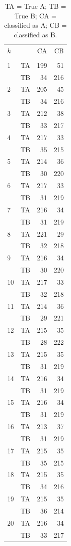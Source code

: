 \documentclass[a4paper,11pt]{article}
\begin{document}
\begin{table}
  \caption{TA = True A; TB = True B; CA = classified as A; CB = classified as B.}
\begin{tabular}{lcrr}
$k$ && CA & CB \\ \\
 1 & TA & 199 &    51 \\
& TB &  34 &   216 \\
 2 & TA & 205 &    45 \\
& TB &  34 &   216 \\
 3 & TA & 212 &    38 \\
& TB &  33 &   217 \\
 4 & TA & 217 &    33 \\
& TB &  35 &   215 \\
 5 & TA & 214 &    36 \\
& TB &  30 &   220 \\
 6 & TA & 217 &    33 \\
& TB &  31 &   219 \\
 7 & TA & 216 &    34 \\
& TB &  31 &   219 \\
 8 & TA & 221 &    29 \\
& TB &  32 &   218 \\
 9 & TA & 216 &    34 \\
& TB &  30 &   220 \\
 10 & TA & 217 &    33 \\
& TB &  32 &   218 \\
 11 & TA & 214 &    36 \\
& TB &  29 &   221 \\
 12 & TA & 215 &    35 \\
& TB &  28 &   222 \\
 13 & TA & 215 &    35 \\
& TB &  31 &   219 \\
 14 & TA & 216 &    34 \\
& TB &  31 &   219 \\
 15 & TA & 216 &    34 \\
& TB &  31 &   219 \\
 16 & TA & 213 &    37 \\
& TB &  31 &   219 \\
 17 & TA & 215 &    35 \\
& TB &  35 &   215 \\
 18 & TA & 215 &    35 \\
& TB &  34 &   216 \\
 19 & TA & 215 &    35 \\
& TB &  36 &   214 \\
 20 & TA & 216 &    34 \\
& TB &  33 &   217 \\
\end{tabular}
\end{table}
\end{document}
